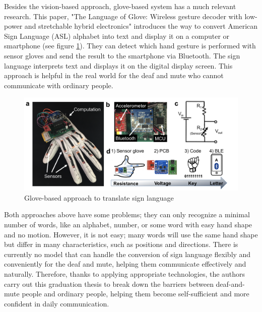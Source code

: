Besides the vision-based approach, glove-based system has a much relevant research. This paper, "The Language of Glove: Wireless gesture decoder with low-power and stretchable hybrid electronics" \cite{o2017language} introduces the way to convert American Sign Language (ASL) alphabet into text and display it on a computer or smartphone (see figure \ref{fig:Chap2-Glove-Base}). They can detect which hand gesture is performed with sensor gloves and send the result to the smartphone via Bluetooth. The sign language interprets text and displays it on the digital display screen. This approach is helpful in the real world for the deaf and mute who cannot communicate with ordinary people.

\begin{figure}[H]
  \centering
  \includegraphics[width=\textwidth]{img/Chap2/Glove-Based.png}
  \caption{Glove-based approach to translate sign language}
  \label{fig:Chap2-Glove-Base}
\end{figure}

Both approaches above have some problems; they can only recognize a minimal number of words, like an alphabet, number, or some word with easy hand shape and no motion. However, it is not easy; many words will use the same hand shape but differ in many characteristics, such as positions and directions. There is currently no model that can handle the conversion of sign language flexibly and conveniently for the deaf and mute, helping them communicate effectively and naturally. Therefore, thanks to applying appropriate technologies, the authors carry out this graduation thesis to break down the barriers between deaf-and-mute people and ordinary people, helping them become self-sufficient and more confident in daily communication.

